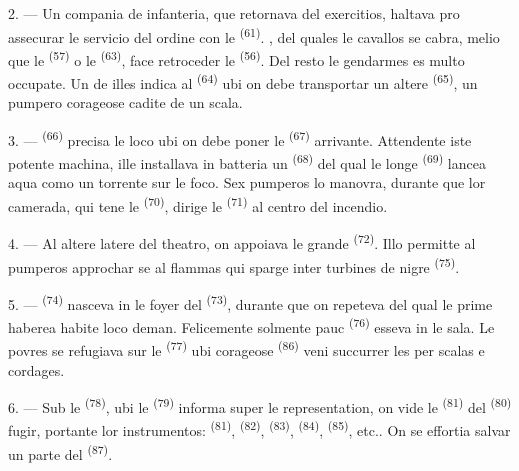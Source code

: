 2. --- Un compania de infanteria, que retornava del exercitios, haltava pro
assecurar le servicio del ordine con le 
\textsuperscript{(61)}. , del quales le cavallos se
cabra, melio que le  \textsuperscript{(57)} o le
 \textsuperscript{(63)}, face retroceder le
 \textsuperscript{(56)}. Del resto le gendarmes es multo
occupate. Un de illes indica al  \textsuperscript{(64)} ubi on
debe transportar un altere  \textsuperscript{(65)}, un
pumpero corageose cadite de un scala.

3. ---  \textsuperscript{(66)} precisa le loco ubi on debe
poner le  \textsuperscript{(67)} arrivante. Attendente iste
potente machina, ille installava in batteria un 
\textsuperscript{(68)} del qual le longe  \textsuperscript{(69)}
lancea aqua como un torrente sur le foco. Sex pumperos lo manovra, durante que
lor camerada, qui tene le  \textsuperscript{(70)}, dirige le
 \textsuperscript{(71)} al centro del incendio.

4. --- Al altere latere del theatro, on appoiava le grande 
\textsuperscript{(72)}. Illo permitte al pumperos approchar se al flammas qui
sparge inter turbines de nigre  \textsuperscript{(75)}.

\VUsaut{5.0mm}
\VUsaut{3.4mm}

5. ---  \textsuperscript{(74)} nasceva in le foyer del
 \textsuperscript{(73)}, durante que on repeteva  del qual le prime  haberea habite loco deman.
Felicemente solmente pauc  \textsuperscript{(76)} esseva in
le sala. Le povres se refugiava sur le  \textsuperscript{(77)}
ubi corageose  \textsuperscript{(86)} veni succurrer les per
scalas e cordages.

6. --- Sub le  \textsuperscript{(78)}, ubi le 
\textsuperscript{(79)} informa super le representation, on vide le
 \textsuperscript{(81)} del 
\textsuperscript{(80)} fugir, portante lor instrumentos: 
\textsuperscript{(81)},  \textsuperscript{(82)},
 \textsuperscript{(83)}, 
\textsuperscript{(84)},  \textsuperscript{(85)}, etc.. On se
effortia salvar un parte del  \textsuperscript{(87)}.

